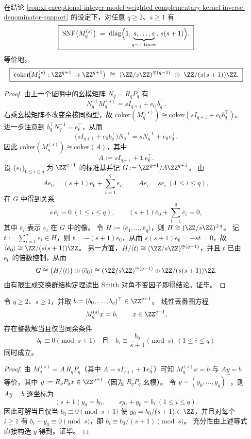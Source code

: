 \begin{conclusion}\label{con:xi-exceptional-integer-model-weighted-complementary-kernel-snf-cokernel}
在结论 \ref{con:xi-exceptional-integer-model-weighted-complementary-kernel-inverse-denominator-support} 的设定下，对任意 \(q\ge 2\)、\(s\ge 1\) 有
\[
\boxed{\;
\mathrm{SNF}\bigl(M_q^{(s)}\bigr)
\;=\;
\mathrm{diag}\Bigl(1,\underbrace{s,\dots,s}_{q-1\ \mathrm{times}},\,s(s+1)\Bigr).\;}
\]
等价地，
\[
\boxed{\;
\mathrm{coker}\!\bigl(M_q^{(s)}:\ZZ^{q+1}\to\ZZ^{q+1}\bigr)
\ \cong\ (\ZZ/s\ZZ)^{\oplus(q-1)}\ \oplus\ \ZZ/(s(s+1))\ZZ.\;}
\]
\end{conclusion}
\begin{proof}
由上一个证明中的幺模矩阵 \(N_q=R_qP_q\) 有
\[
N_q^{-1}M_q^{(s)}=sI_{q+1}+e_0\,b_q^{\top}.
\]
右乘幺模矩阵不改变余核同构型，故
\(
\mathrm{coker}(M_q^{(s)})\cong \mathrm{coker}(sI_{q+1}+e_0b_q^{\top})
\)。
进一步注意到 \(b_q^{\top}N_q^{-1}=e_0^{\top}\)，从而
\[
\bigl(sI_{q+1}+e_0b_q^{\top}\bigr)N_q^{-1}=sN_q^{-1}+e_0e_0^{\top}.
\]
因此 \(\mathrm{coker}(M_q^{(s)})\cong \mathrm{coker}(A)\)，其中
\[
A:=sI_{q+1}+\mathbf 1\,e_0^{\top}.
\]
设 \(\{e_i\}_{0\le i\le q}\) 为 \(\ZZ^{q+1}\) 的标准基并记 \(G:=\ZZ^{q+1}/A\ZZ^{q+1}\)。
由
\[
Ae_0=(s+1)e_0+\sum_{i=1}^{q}e_i,\qquad
Ae_i=s e_i\ (1\le i\le q),
\]
在 \(G\) 中得到关系
\[
s\,\bar e_i=0\ (1\le i\le q),\qquad (s+1)\bar e_0+\sum_{i=1}^{q}\bar e_i=0,
\]
其中 \(\bar e_i\) 表示 \(e_i\) 在 \(G\) 中的像。
令 \(H:=\langle \bar e_1,\dots,\bar e_q\rangle\)，则 \(H\cong(\ZZ/s\ZZ)^{\oplus q}\)。
记 \(t:=\sum_{i=1}^{q}\bar e_i\in H\)，则 \(t=-(s+1)\bar e_0\)，从而
\(
s(s+1)\bar e_0=-s t=0
\)，故 \(\langle \bar e_0\rangle\cong \ZZ/(s(s+1))\ZZ\)。
另一方面，\(H/\langle t\rangle\cong(\ZZ/s\ZZ)^{\oplus(q-1)}\)，并且 \(t\) 已由 \(\bar e_0\) 的倍数控制，从而
\[
G\cong \bigl(H/\langle t\rangle\bigr)\oplus \langle \bar e_0\rangle
\cong(\ZZ/s\ZZ)^{\oplus(q-1)}\oplus \ZZ/(s(s+1))\ZZ.
\]
由有限生成交换群结构定理读出 Smith 对角不变因子即得结论。证毕。
\end{proof}

\begin{corollary}[整数可解性的显式同余判据]\label{cor:xi-exceptional-integer-model-weighted-complementary-kernel-diophantine-congruence}
令 \(q\ge 2\)、\(s\ge 1\)，并取 \(b=(b_0,\dots,b_q)^{\top}\in\ZZ^{q+1}\)。
线性丢番图方程
\[
M_q^{(s)}x=b,\qquad x\in\ZZ^{q+1},
\]
存在整数解当且仅当同余条件
\[
\boxed{\;
b_0\equiv 0\pmod{s+1}
\quad\text{且}\quad
b_i\equiv \frac{b_0}{s+1}\pmod{s}\ \ (1\le i\le q)\;}
\]
同时成立。
\end{corollary}
\begin{proof}
由 \(M_q^{(s)}=A\,R_qP_q\)（其中 \(A=sI_{q+1}+\mathbf 1 e_0^{\top}\)）可知
\(
M_q^{(s)}x=b
\)
与
\(
Ay=b
\)
等价，其中 \(y:=R_qP_qx\in\ZZ^{q+1}\)（因为 \(R_qP_q\) 幺模）。
令 \(y=(y_0,\dots,y_q)^{\top}\)，则 \(Ay=b\) 逐坐标为
\[
(s+1)y_0=b_0,\qquad sy_i+y_0=b_i\ (1\le i\le q).
\]
因此可解当且仅当 \(b_0\equiv 0\pmod{s+1}\) 使 \(y_0=b_0/(s+1)\in\ZZ\)，并且对每个 \(i\ge 1\) 有
\(
b_i-y_0\equiv 0\pmod{s}
\)，即 \(b_i\equiv b_0/(s+1)\pmod{s}\)。
充分性由上述等式直接构造 \(y\) 得到。证毕。
\end{proof}

